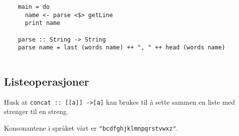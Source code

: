 \documentclass{article}
\begin{document}
    \begin{ans}
        \hspace{1em}
        \begin{lstlisting}
    main = do
      name <- parse <$> getLine
      print name

    parse :: String -> String
    parse name = last (words name) ++ ", " ++ head (words name)
            
        \end{lstlisting}
    \end{ans}

\subsection{Listeoperasjoner}
Husk at \texttt{concat :: [[a]] ->[a]} kan brukes til å sette sammen en liste med strenger til en streng.

Konsonantene i språket vårt er \texttt{"bcdfghjklmnpqrstvwxz"}.
\end{document}
